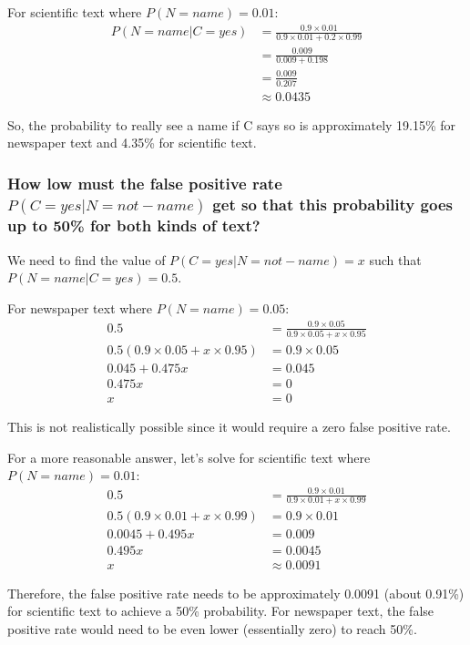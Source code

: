 \documentclass[a4paper,margin=1cm]{article}
\begin{document}
For scientific text where $P(N = name) = 0.01$:
\begin{align*}
P(N = name|C = yes) &= \frac{0.9 \times 0.01}{0.9 \times 0.01 + 0.2 \times 0.99}\\
&= \frac{0.009}{0.009 + 0.198}\\
&= \frac{0.009}{0.207}\\
&\approx 0.0435
\end{align*}

So, the probability to really see a name if C says so is approximately 19.15\% for newspaper text and 4.35\% for scientific text.

\subsubsection{How low must the false positive rate $P(C=yes|N=not-name)$ get so that this probability goes up to 50\% for both kinds of text?}

We need to find the value of $P(C=yes|N=not-name) = x$ such that $P(N=name|C=yes) = 0.5$.

For newspaper text where $P(N = name) = 0.05$:
\begin{align*}
0.5 &= \frac{0.9 \times 0.05}{0.9 \times 0.05 + x \times 0.95}\\
0.5(0.9 \times 0.05 + x \times 0.95) &= 0.9 \times 0.05\\
0.045 + 0.475x &= 0.045\\
0.475x &= 0\\
x &= 0
\end{align*}

This is not realistically possible since it would require a zero false positive rate.

For a more reasonable answer, let's solve for scientific text where $P(N = name) = 0.01$:
\begin{align*}
0.5 &= \frac{0.9 \times 0.01}{0.9 \times 0.01 + x \times 0.99}\\
0.5(0.9 \times 0.01 + x \times 0.99) &= 0.9 \times 0.01\\
0.0045 + 0.495x &= 0.009\\
0.495x &= 0.0045\\
x &\approx 0.0091
\end{align*}

Therefore, the false positive rate needs to be approximately 0.0091 (about 0.91\%) for scientific text to achieve a 50\% probability. For newspaper text, the false positive rate would need to be even lower (essentially zero) to reach 50\%.
\end{document}
